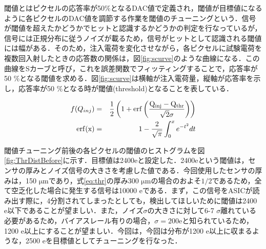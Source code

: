 %
閾値とはピクセルの応答率が50$\mathrm{\%}$となるDAC値で定義され，閾値が目標値になるように各ピクセルのDAC値を調節する作業を閾値のチューニングという．信号が閾値を超えたかどうかでヒットと認識するかどうかの判定を行なっているが，信号には正規分布に従うノイズが載るため，信号がヒットとして認識される閾値には幅がある．そのため，注入電荷を変化させながら，各ピクセルに試験電荷を複数回入射したときの応答数の関係は，図\ref{fig:scurve}のような曲線になる．この曲線をSカーブと呼び，これを誤差関数でフィッティングすることで，応答率が50 $\mathrm{\%}$となる閾値を求める．図\ref{fig:scurve}は横軸が注入電荷量，縦軸が応答率を示し，応答率が50 $\mathrm{\%}$となる時が閾値(threshold)となることを表している．


\begin{eqnarray}
  f(Q_{inj}) &=& \frac{1}{2} \left( 1 + \rm{erf} \left( \frac{Q_{inj} - Q_{thr}}{\sqrt{2} \sigma} \right) \right) \\
  \rm{erf}(x) &=& 1- \frac{2}{\sqrt{\pi}} \int^x _0 e^{-t^2} dt
  \label{eq:scurve}
\end{eqnarray}


閾値チューニング前後の各ピクセルの閾値のヒストグラムを図\ref{fig:ThrDistBefore}に示す．目標値は2400$\mathrm{e}$と設定した．2400$\mathrm{e}$という閾値は，センサの厚みとノイズ信号の大きさを考慮した値である．今回使用したセンサの厚みは，150 $\mathrm{\mu m}$であり，式\ref{eq:thr}の厚み300 $\mathrm{\mu m}$の場合のおよそ$1/2$であるため，全て空乏化した場合に発生する信号は10000 $\mathrm{e}$である．まず，この信号をASICが読み出す際に，4分割されてしまったとしても，検出してほしいために閾値は2400 $\mathrm{e}$以下であることが望ましい．また，ノイズ$\sigma$の大きさに対して6-7 $\sigma$離れている必要があるため，バイアスレール有りの場合，$\sigma = 200 \mathrm{e}$と知られているため，1200 $\mathrm{e}$以上にすることが望ましい．今回は，今回は分布が1200 $\mathrm{e}$以上に収まるような，2500 $\mathrm{e}$を目標値としてチューニングを行なった．

